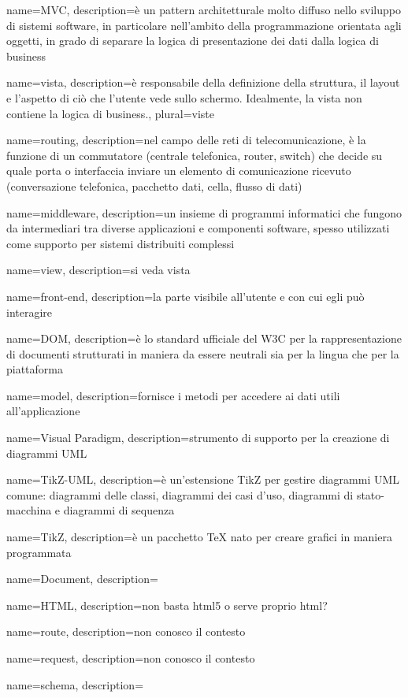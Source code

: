  {
	name=MVC,
	description={è un pattern architetturale molto diffuso nello sviluppo di sistemi software, in particolare nell'ambito della programmazione orientata agli oggetti, in grado di separare la logica di presentazione dei dati dalla logica di business}
}

 {
	name=vista,
	description={è responsabile della definizione della struttura, il layout e l'aspetto di ciò che l'utente vede sullo schermo. Idealmente, la vista non contiene la logica di business.},
	plural=viste
}

 {
	name=routing,
	description={nel campo delle reti di telecomunicazione, è la funzione di un commutatore (centrale telefonica, router, switch) che decide su quale porta o interfaccia inviare un elemento di comunicazione ricevuto (conversazione telefonica, pacchetto dati, cella, flusso di dati)}
}

 {
	name=middleware,
	description={un insieme di programmi informatici che fungono da intermediari tra diverse applicazioni e componenti software,  spesso utilizzati come supporto per sistemi distribuiti complessi}
}

 {
	name=view,
	description={si veda vista}
}

 {
	name=front-end,
	description={la parte visibile all'utente e con cui egli può interagire}
}

 {
	name=DOM,
	description={è lo standard ufficiale del W3C per la rappresentazione di documenti strutturati in maniera da essere neutrali sia per la lingua che per la piattaforma}
}

 {
	name=model,
	description={fornisce i metodi per accedere ai dati utili all'applicazione}
}

 {
	name=Visual Paradigm,
	description={strumento di supporto per la creazione di diagrammi UML}
}

 {
	name=TikZ-UML,
	description={è un'estensione TikZ per gestire diagrammi UML comune: diagrammi delle classi, diagrammi dei casi d'uso, diagrammi di stato-macchina e diagrammi di sequenza}
}

 {
	name=TikZ,
	description={è un pacchetto TeX nato per creare grafici in maniera programmata}
}




 {
	name=Document,
	description={\TODO{}}
}

 {
	name=HTML,
	description={non basta html5 o serve proprio html?}
}

 {
	name=route,
	description={non conosco il contesto}
}

 {
	name=request,
	description={non conosco il contesto}
}

 {
	name=schema,
	description={\TODO{}}
}
